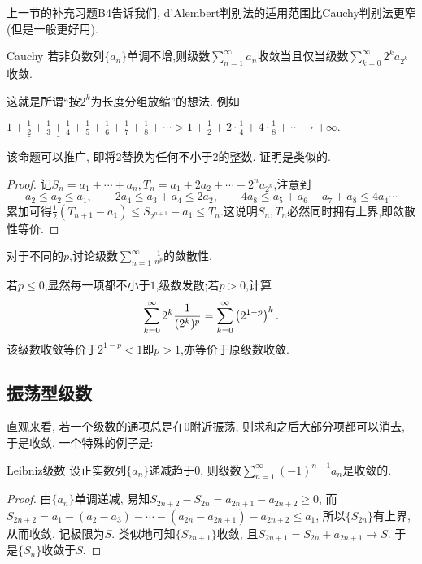 上一节的补充习题B4告诉我们, d'Alembert判别法的适用范围比Cauchy判别法更窄(但是一般更好用). 

\begin{proposition}{Cauchy}
	若非负数列$\{ a_n \}$单调不增,则级数$\sum_{n=1}^{\infty} a_n$收敛当且仅当级数$\sum_{k=0}^{\infty} 2^ka_{2^k}$收敛.
\end{proposition}
\begin{remark}
	这就是所谓“按$2^k$为长度分组放缩”的想法. 例如
	\begin{center}
		$\displaystyle \underline{1}+\underline{\frac{1}{2}}+\underline{\frac{1}{3}+\frac{1}{4}}+\underline{\frac{1}{5}+\frac{1}{6}+\frac{1}{7}+\frac{1}{8}}+ \cdots > 1+\frac{1}{2}+2 \cdot \frac{1}{4} + 4 \cdot \frac{1}{8}+\cdots \to +\infty .$
	\end{center}
\end{remark}
\begin{remark}
	该命题可以推广, 即将$2$替换为任何不小于$2$的整数. 证明是类似的. 
\end{remark}
\begin{proof}
	记$S_n=a_1+\cdots +a_n,T_n=a_1+2a_2+\cdots +2^na_{2^n}$,注意到$$a_2 \leq a_2 \leq a_1,\qquad 2a_4\leq a_3+a_4 \leq 2a_2,\qquad 4a_8 \leq a_5+a_6+a_7+a_8 \leq 4a_4 \cdots$$
	累加可得$\frac{1}{2}(T_{n+1}-a_1) \leq S_{2^{n+1}}-a_1 \leq T_n$.这说明$S_n,T_n$必然同时拥有上界,即敛散性等价.
\end{proof}

\begin{example}
	对于不同的$p$,讨论级数$\sum_{n=1}^{\infty} \frac{1}{n^p}$的敛散性.
\end{example}
\begin{solution}
	若$p\leq 0$,显然每一项都不小于$1$,级数发散;若$p>0$,计算$$\sum_{k=0}^{\infty} 2^k \frac{1}{(2^k)^p} = \sum_{k=0}^{\infty} \left( 2^{1-p} \right)^k.$$
	该级数收敛等价于$2^{1-p}<1$即$p>1$,亦等价于原级数收敛.
\end{solution}

\subsection{振荡型级数}

直观来看, 若一个级数的通项总是在$0$附近振荡, 则求和之后大部分项都可以消去, 于是收敛. 一个特殊的例子是: 

\begin{proposition}{Leibniz级数}
	设正实数列$\{ a_n \}$递减趋于$0$, 则级数$\sum_{n=1}^{\infty} (-1)^{n-1}a_n$是收敛的. 
\end{proposition}
\begin{proof}
	由$\{ a_n \}$单调递减, 易知$S_{2n+2}-S_{2n}=a_{2n+1}-a_{2n+2} \geq 0$, 而$S_{2n+2} = a_1-(a_2-a_3)-\cdots -(a_{2n}-a_{2n+1})-a_{2n+2} \leq a_1$, 所以$\{ S_{2n} \}$有上界, 从而收敛, 记极限为$S$. 类似地可知$\{ S_{2n+1} \}$收敛, 且$S_{2n+1}=S_{2n}+a_{2n+1} \to S$. 于是$\{ S_n \}$收敛于$S$. 
\end{proof}

